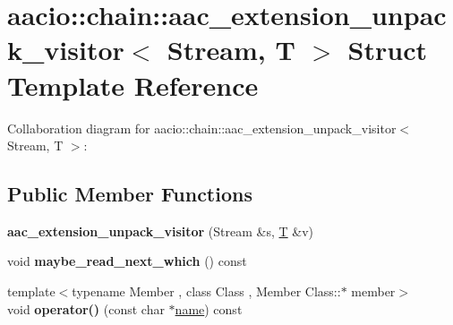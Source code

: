 \hypertarget{structaacio_1_1chain_1_1aac__extension__unpack__visitor}{}\section{aacio\+:\+:chain\+:\+:aac\+\_\+extension\+\_\+unpack\+\_\+visitor$<$ Stream, T $>$ Struct Template Reference}
\label{structaacio_1_1chain_1_1aac__extension__unpack__visitor}


Collaboration diagram for aacio\+:\+:chain\+:\+:aac\+\_\+extension\+\_\+unpack\+\_\+visitor$<$ Stream, T $>$\+:
\subsection*{Public Member Functions}
\begin{DoxyCompactItemize}
\item 
\mbox{\label{structaacio_1_1chain_1_1aac__extension__unpack__visitor_ad0653526739ba235a602d9f4467bea30}} 
{\bfseries aac\+\_\+extension\+\_\+unpack\+\_\+visitor} (Stream \&s, \mbox{\hyperlink{struct_t}{T}} \&v)
\item 
\mbox{\label{structaacio_1_1chain_1_1aac__extension__unpack__visitor_a1a42129709fcb7b1139960cebdceead1}} 
void {\bfseries maybe\+\_\+read\+\_\+next\+\_\+which} () const
\item 
\mbox{\label{structaacio_1_1chain_1_1aac__extension__unpack__visitor_ad5dd50d69c9ee3c9194bed94796edd62}} 
{\footnotesize template$<$typename Member , class Class , Member Class\+::$\ast$ member$>$ }\\void {\bfseries operator()} (const char $\ast$\mbox{\hyperlink{structaacio_1_1chain_1_1name}{name}}) const
\end{DoxyCompactItemize}
